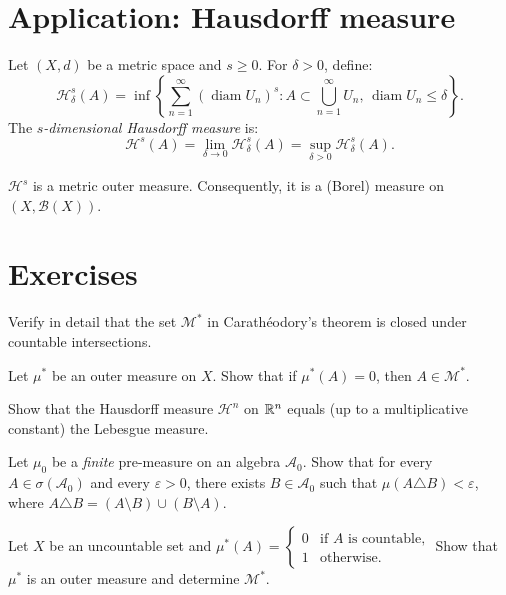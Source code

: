 \section{Application: Hausdorff measure}

\begin{definition}
Let $(X, d)$ be a metric space and $s \geq 0$. For $\delta > 0$, define:
\[
\mathcal{H}^s_\delta(A) = \inf\left\{\sum_{n=1}^{\infty} (\operatorname{diam}
U_n)^s : A \subset \bigcup_{n=1}^{\infty} U_n,\,
\operatorname{diam} U_n \leq \delta\right\}.
\]
The \emph{$s$-dimensional Hausdorff measure} is:
\[
\mathcal{H}^s(A) = \lim_{\delta \to 0} \mathcal{H}^s_\delta(A) =
\sup_{\delta > 0} \mathcal{H}^s_\delta(A).
\]
\end{definition}

\begin{proposition}
$\mathcal{H}^s$ is a metric outer measure. Consequently, it is a (Borel) measure
on $(X, \mathcal{B}(X))$.
\end{proposition}

\section{Exercises}

\begin{exercise}
Verify in detail that the set $\mathcal{M}^*$ in Carath\'eodory's theorem is closed
under countable intersections.
\end{exercise}

\begin{exercise}
Let $\mu^*$ be an outer measure on $X$. Show that if $\mu^*(A) = 0$, then
$A \in \mathcal{M}^*$.
\end{exercise}

\begin{exercise}
Show that the Hausdorff measure $\mathcal{H}^n$ on $\mathbb{R}^n$ equals (up to a
multiplicative constant) the Lebesgue measure.
\end{exercise}

\begin{exercise}
Let $\mu_0$ be a \emph{finite} pre-measure on an algebra $\mathcal{A}_0$. Show that
for every $A \in \sigma(\mathcal{A}_0)$ and every $\varepsilon > 0$, there exists
$B \in \mathcal{A}_0$ such that $\mu(A \triangle B) < \varepsilon$, where
$A \triangle B = (A \setminus B) \cup (B \setminus A)$.
\end{exercise}

\begin{exercise}
Let $X$ be an uncountable set and
$\mu^*(A) = \begin{cases} 0 & \text{if } A \text{ is countable,} \\
1 & \text{otherwise.} \end{cases}$
Show that $\mu^*$ is an outer measure and determine $\mathcal{M}^*$.
\end{exercise}
